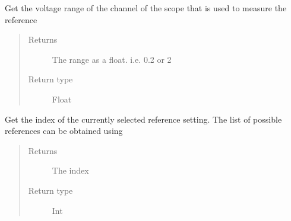 \documentclass[letterpaper,10pt,english]{sphinxmanual}
\begin{document}
\begin{fulllineitems}
\begin{fulllineitems}
\begin{quote}
\begin{description}
\end{description}\end{quote}

\end{fulllineitems}


\begin{fulllineitems}
\label{\detokenize{index:TiePieLCR_settings.TiePieLCR_settings.get_reference_scope_range_value}}
\sphinxAtStartPar
Get the voltage range of the channel of the scope that is used to measure the reference
\begin{quote}\begin{description}
\item[{Returns}] \leavevmode
\sphinxAtStartPar
The range as a float. i.e. 0.2 or 2

\item[{Return type}] \leavevmode
\sphinxAtStartPar
Float

\end{description}\end{quote}

\end{fulllineitems}


\begin{fulllineitems}
\label{\detokenize{index:TiePieLCR_settings.TiePieLCR_settings.get_reference_setting}}
\sphinxAtStartPar
Get the index of the currently selected reference setting. The list of possible references can be obtained using {\hyperref[\detokenize{index:TiePieLCR_settings.TiePieLCR_settings.get_gain_name_list}]{}}
\begin{quote}\begin{description}
\item[{Returns}] \leavevmode
\sphinxAtStartPar
The index

\item[{Return type}] \leavevmode
\sphinxAtStartPar
Int


\end{description}
\end{quote}
\end{fulllineitems}
\end{fulllineitems}
\end{document}
